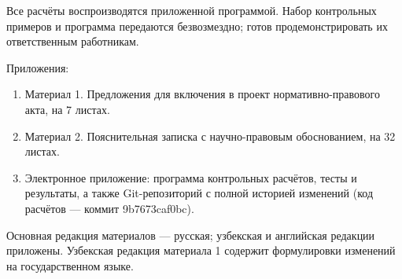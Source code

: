 \documentclass[14pt,a4paper]{extarticle}
\begin{document}
Все расчёты воспроизводятся приложенной программой. Набор контрольных примеров и программа передаются безвозмездно; готов продемонстрировать их ответственным работникам.

\noindent Приложения:
\begin{enumerate}[leftmargin=1.27cm,label=\arabic*.]
\item Материал 1. Предложения для включения в проект нормативно-правового акта, на 7 листах.
\item Материал 2. Пояснительная записка с научно-правовым обоснованием, на 32 листах.
\item Электронное приложение: программа контрольных расчётов, тесты и результаты, а также Git-репозиторий с полной историей изменений (код расчётов — коммит 9b7673caf0bc).
\end{enumerate}
Основная редакция материалов — русская; узбекская и английская редакции приложены. Узбекская редакция материала 1 содержит формулировки изменений на государственном языке.
\end{document}

